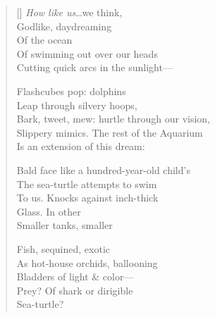 \label{ch:dolphins}
\settowidth{\versewidth}{Bark, tweet, mew: hurtle through our vision,}
\begin{verse}[\versewidth]
\textit{How like us}\ldots we think,\\
Godlike, daydreaming\\
Of the ocean\\
Of swimming out over our heads\\
Cutting quick arcs in the sunlight---

Flashcubes pop: dolphins\\
Leap through silvery hoops,\\
Bark, tweet, mew: hurtle through our vision,\\
Slippery mimics. The rest of the Aquarium\\
Is an extension of this dream:

Bald face like a hundred-year-old child's\\
The sea-turtle attempts to swim\\
To us. Knocks against inch-thick\\
Glass.     In other\\
Smaller tanks, smaller

Fish, sequined, exotic\\
As hot-house orchids, ballooning\\
Bladders of light \& color---\\
Prey? Of shark or dirigible\\
Sea-turtle?
\end{verse}
